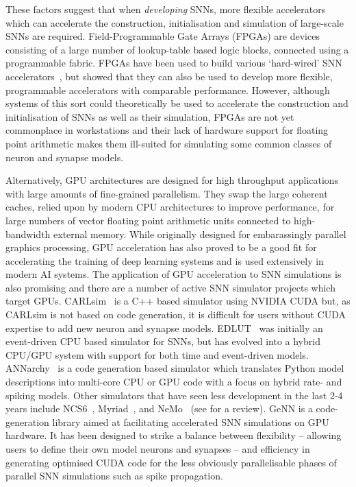 \documentclass[utf8]{frontiersSCNS} %
\begin{document}
These factors suggest that when \textit{developing} SNNs, more flexible accelerators which can accelerate the construction, initialisation and simulation of large-scale SNNs are required.
Field-Programmable Gate Arrays (FPGAs) are devices consisting of a large number of lookup-table based logic blocks, connected using a programmable fabric.
FPGAs have been used to build various `hard-wired' SNN accelerators~\citep{Moore2012,Wang2018}, but \citet{Naylor2013} showed that they can also be used to develop more flexible, programmable accelerators with comparable performance.
However, although systems of this sort could theoretically be used to accelerate the construction and initialisation of SNNs as well as their simulation, FPGAs are not yet commonplace in workstations and their lack of hardware support for floating point arithmetic makes them ill-suited for simulating some common classes of neuron and synapse models. 

Alternatively, GPU architectures are designed for high throughput applications with large amounts of fine-grained parallelism.
They swap the large coherent caches, relied upon by modern CPU architectures to improve performance, for large numbers of vector floating point arithmetic units connected to high-bandwidth external memory. 
While originally designed for embarassingly parallel graphics processing, GPU acceleration has also proved to be a good fit for accelerating the training of deep learning systems and is used extensively in modern AI systems. 
The application of GPU acceleration to SNN simulations is also promising and there are a number of active SNN simulator projects which target GPUs. 
CARLsim~\citep{Chou2018} is a C++ based simulator using NVIDIA CUDA but, as CARLsim is not based on code generation, it is difficult for users without CUDA expertise to add new neuron and synapse models.
EDLUT~\citep{Garrido2011} was initially an event-driven CPU based simulator for SNNs, but has evolved into a hybrid CPU/GPU system with support for both time and event-driven models.
ANNarchy~\citep{Vitay2015} is a code generation based simulator which translates Python model descriptions into multi-core CPU or GPU code with a focus on hybrid rate- and spiking models.
Other simulators that have seen less development in the last 2-4 years include NCS6~\citep{Hoang2013}, Myriad~\citep{Rittner2016}, and NeMo~\citep{Fidjeland2009} (see \citet{Brette2012} for a review).
GeNN \citep{Yavuz2016} is a code-generation library aimed at facilitating accelerated SNN simulations on GPU hardware.
It has been designed to strike a balance between flexibility -- allowing users to define their own model neurons and synapses -- and efficiency in generating optimised CUDA code for the less obviously parallelisable phases of parallel SNN simulations such as spike propagation.
\end{document}
